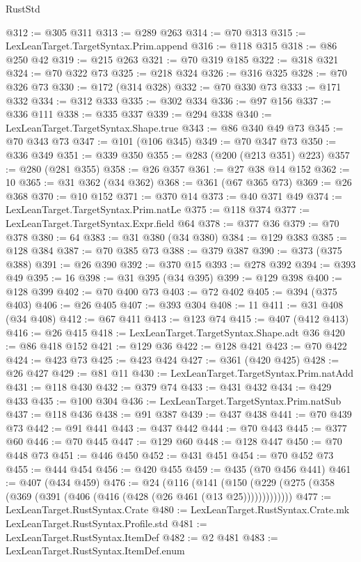 \begin{lexlean}{RustStd}
\begin{coremodule}
{\begin{coremodule}
{{{{{{{{{{{{{{{{@312 := @305 @311
@313 := @289 @263
@314 := @70 @313
@315 := LexLeanTarget.TargetSyntax.Prim.append
@316 := @118 @315
@318 := @86 @250 @42
@319 := @215 @263
@321 := @70 @319 @185
@322 := @318 @321
@324 := @70 @322 @73
@325 := @218 @324
@326 := @316 @325
@328 := @70 @326 @73
@330 := @172 (@314 @328)
@332 := @70 @330 @73
@333 := @171 @332
@334 := @312 @333
@335 := @302 @334
@336 := @97 @156
@337 := @336 @111
@338 := @335 @337
@339 := @294 @338
@340 := LexLeanTarget.TargetSyntax.Shape.true
@343 := @86 @340 @49 @73
@345 := @70 @343 @73
@347 := @101 (@106 @345)
@349 := @70 @347 @73
@350 := @336 @349
@351 := @339 @350
@355 := @283 (@200 (@213 @351) @223)
@357 := @280 (@281 @355)
@358 := @26 @357
@361 := @27 @38 @14 @152
@362 := 10
@365 := @31 @362 (@34 @362)
@368 := @361 (@67 @365 @73)
@369 := @26 @368
@370 := @10 @152
@371 := @370 @14
@373 := @40 @371 @49
@374 := LexLeanTarget.TargetSyntax.Prim.natLe
@375 := @118 @374
@377 := LexLeanTarget.TargetSyntax.Expr.field @64
@378 := @377 @36
@379 := @70 @378
@380 := 64
@383 := @31 @380 (@34 @380)
@384 := @129 @383
@385 := @128 @384
@387 := @70 @385 @73
@388 := @379 @387
@390 := @373 (@375 @388)
@391 := @26 @390
@392 := @370 @15
@393 := @278 @392
@394 := @393 @49
@395 := 16
@398 := @31 @395 (@34 @395)
@399 := @129 @398
@400 := @128 @399
@402 := @70 @400 @73
@403 := @72 @402
@405 := @394 (@375 @403)
@406 := @26 @405
@407 := @393 @304
@408 := 11
@411 := @31 @408 (@34 @408)
@412 := @67 @411
@413 := @123 @74
@415 := @407 (@412 @413)
@416 := @26 @415
@418 := LexLeanTarget.TargetSyntax.Shape.adt @36
@420 := @86 @418 @152
@421 := @129 @36
@422 := @128 @421
@423 := @70 @422
@424 := @423 @73
@425 := @423 @424
@427 := @361 (@420 @425)
@428 := @26 @427
@429 := @81 @11
@430 := LexLeanTarget.TargetSyntax.Prim.natAdd
@431 := @118 @430
@432 := @379 @74
@433 := @431 @432
@434 := @429 @433
@435 := @100 @304
@436 := LexLeanTarget.TargetSyntax.Prim.natSub
@437 := @118 @436
@438 := @91 @387
@439 := @437 @438
@441 := @70 @439 @73
@442 := @91 @441
@443 := @437 @442
@444 := @70 @443
@445 := @377 @60
@446 := @70 @445
@447 := @129 @60
@448 := @128 @447
@450 := @70 @448 @73
@451 := @446 @450
@452 := @431 @451
@454 := @70 @452 @73
@455 := @444 @454
@456 := @420 @455
@459 := @435 (@70 @456 @441)
@461 := @407 (@434 @459)
@476 := @24
    (@116
      (@141 (@150 (@229 (@275 (@358 (@369 (@391 (@406 (@416 (@428 (@26 @461 (@13 @25)))))))))))))
@477 := LexLeanTarget.RustSyntax.Crate
@480 := LexLeanTarget.RustSyntax.Crate.mk LexLeanTarget.RustSyntax.Profile.std
@481 := LexLeanTarget.RustSyntax.ItemDef
@482 := @2 @481
@483 := LexLeanTarget.RustSyntax.ItemDef.enum
}}}}}}}}}}}}}}}}
\end{coremodule}}
\end{coremodule}
\end{lexlean}
